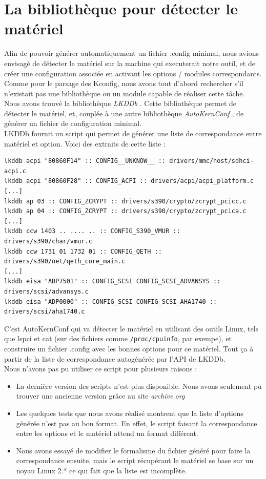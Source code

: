 \documentclass[17pts]{report}
\begin{document}
\section{La bibliothèque pour détecter le matériel}
\label{sec:La bibliothèque pour détecter le matériel}
Afin de pouvoir générer automatiquement un fichier .config minimal, nous avions
envisagé de détecter le matériel sur la machine qui executerait notre outil, et
de créer une configuration associée en activant les options / modules
correspondants. Comme pour le parsage des Kconfig, nous avons tout d'abord
rechercher s'il n'existait pas une bibliothèque ou un module capable de
réaliser cette tâche. Nous avons trouvé la bibliothèque \textit{LKDDb}
\cite{Existant:lib:lkddb}. Cette bibliothèque permet de détecter le matériel,
et, couplée à une autre bibliothèque \textit{AutoKernConf}
\cite{Existant:lib:autoKernConf}, de générer un fichier de configuration
minimal. \\

LKDDb fournit un script qui permet de générer une liste de correspondance entre
matériel et option. Voici des extraits de cette liste : \\

\begin{verbatim}
lkddb acpi "80860F14" :: CONFIG__UNKNOW__ :: drivers/mmc/host/sdhci-acpi.c
lkddb acpi "80860F28" :: CONFIG_ACPI :: drivers/acpi/acpi_platform.c
[...]
lkddb ap 03 :: CONFIG_ZCRYPT :: drivers/s390/crypto/zcrypt_pcicc.c
lkddb ap 04 :: CONFIG_ZCRYPT :: drivers/s390/crypto/zcrypt_pcica.c
[...]
lkddb ccw 1403 .. .... .. :: CONFIG_S390_VMUR :: drivers/s390/char/vmur.c
lkddb ccw 1731 01 1732 01 :: CONFIG_QETH :: drivers/s390/net/qeth_core_main.c
[...]
lkddb eisa "ABP7501" :: CONFIG_SCSI CONFIG_SCSI_ADVANSYS :: drivers/scsi/advansys.c
lkddb eisa "ADP0000" :: CONFIG_SCSI CONFIG_SCSI_AHA1740 :: drivers/scsi/aha1740.c
\end{verbatim}

C'est AutoKernConf qui va détecter le matériel en utilisant des outils Linux,
tels que lspci et cat (sur des fichiers comme \verb|/proc/cpuinfo|, par
exempe), et construire un fichier .config avec les bonnes options pour ce
matériel. Tout ça à partir de la liste de correspondance autogénérée par l'API
de LKDDb. \\

Nous n'avons pas pu utiliser ce script pour plusieurs raisons :
\begin{itemize}
    \item La dernière version des scripts n'est plus disponible. Nous avons
        seulement pu trouver une ancienne version grâce au site
        \textit{archive.org}
    \item Les quelques tests que nous avons réalisé montrent que la liste
        d'options générée n'est pas au bon format. En effet, le script faisant
        la correspondance entre les options et le matériel attend un format
        différent.
    \item Nous avons essayé de modifier le formalisme du fichier généré pour
        faire la correspondance ensuite, mais le script récupérant le matériel
        se base sur un noyau Linux 2.* ce qui fait que la liste est incomplète.
\end{itemize}
\end{document}

